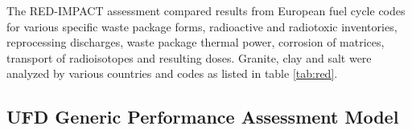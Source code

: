 The RED-IMPACT assessment compared
results from European fuel cycle codes for various specific waste package
forms, radioactive and radiotoxic inventories, reprocessing discharges,  waste
package thermal power, corrosion of matrices, transport of radioisotopes and
resulting doses.  Granite, clay and salt were analyzed by various countries and 
codes as listed in table \ref{tab:red}.







\subsection{UFD Generic Performance Assessment Model}

